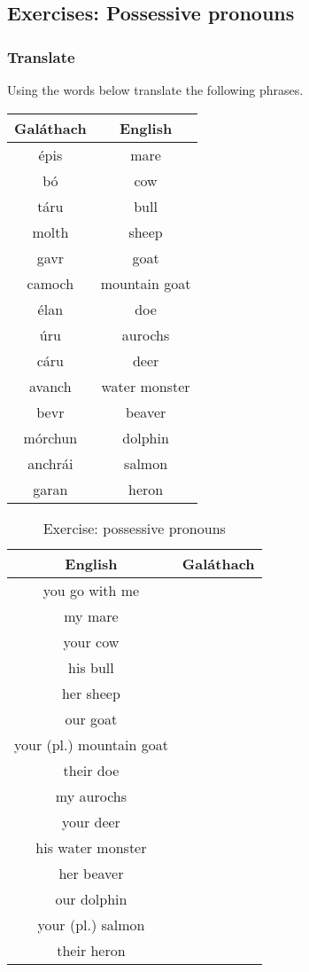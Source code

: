 \newpage
\subsection{Exercises: Possessive pronouns}

\subsubsection{Translate}

Using the words below translate the following phrases.
\begin{table}[H]
\centering
\begin{tabular}{|c|c|}
  \toprule
  \textbf{Gal\'{a}thach} & \textbf{English}\\
  \toprule
  \'{e}pis & mare\\
  b\'{o} & cow\\
  t\'{a}ru & bull\\
  molth & sheep\\
  gavr & goat\\
  camoch & mountain goat\\
  \'{e}lan & doe\\
  \'{u}ru & aurochs\\
  c\'{a}ru & deer\\
  avanch & water monster\\
  bevr & beaver\\
  m\'{o}rchun & dolphin\\
  anchr\'{a}i & salmon\\
  garan & heron\\
  \bottomrule
\end{tabular}
\label{exercise_possessive_pronoun_vocab}
\end{table}

\begin{table}[H]
\centering
\begin{tabular}{|c|M{5.0cm}|}
  \toprule
  \textbf{English} & \textbf{Gal\'{a}thach}\\
  \toprule
  you go with me & \\
  \midrule
  my mare & \\
  \midrule
  your cow & \\
  \midrule
  his bull & \\
  \midrule
  her sheep & \\
  \midrule
  our goat & \\
  \midrule
  your (pl.) mountain goat & \\
  \midrule
  their doe & \\
  \midrule
  my aurochs & \\
  \midrule
  your deer & \\
  \midrule
  his water monster & \\
  \midrule
  her beaver & \\
  \midrule
  our dolphin & \\
  \midrule
  your (pl.) salmon & \\
  \midrule
  their heron & \\
  \bottomrule
\end{tabular}
\label{exercise_possessive_pronouns}
\caption{Exercise: possessive pronouns}
\end{table}


